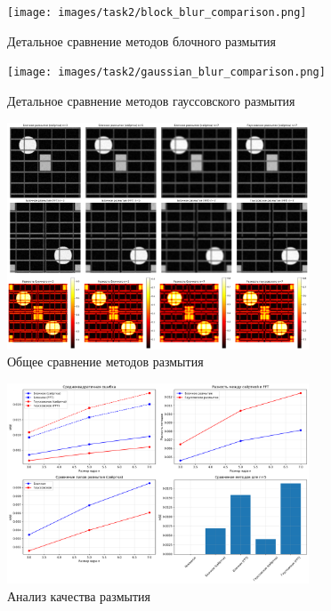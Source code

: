 \begin{figure}[H]
    \centering
    \texttt{[image: images/task2/block\_blur\_comparison.png]}
    \caption{Детальное сравнение методов блочного размытия}
    \label{fig:block_blur_comparison}
\end{figure}

\begin{figure}[H]
    \centering
    \texttt{[image: images/task2/gaussian\_blur\_comparison.png]}
    \caption{Детальное сравнение методов гауссовского размытия}
    \label{fig:gaussian_blur_comparison}
\end{figure}

\begin{figure}[H]
    \centering
    \includegraphics[width=0.8\textwidth]{images/task2/method_comparison.png}
    \caption{Общее сравнение методов размытия}
    \label{fig:method_comparison_blur}
\end{figure}

\begin{figure}[H]
    \centering
    \includegraphics[width=0.8\textwidth]{images/task2/quality_analysis.png}
    \caption{Анализ качества размытия}
    \label{fig:quality_analysis_blur}
\end{figure}

